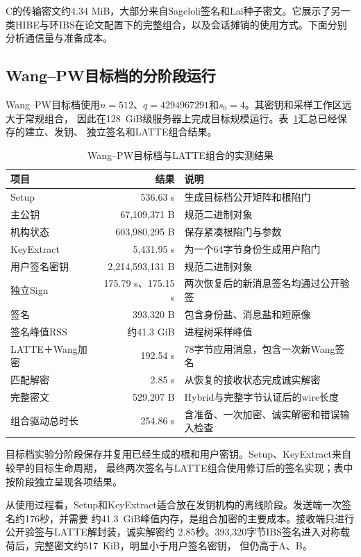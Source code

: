 C的传输密文约4.34 MiB，大部分来自Sageloli签名和Lai种子密文。它展示了另一类HIBE与环IBS在论文配置下的完整组合，以及会话摊销的使用方式。下面分别分析通信量与准备成本。

\subsection{Wang--PW目标档的分阶段运行}

Wang--PW目标档使用$n=512$、$q=4294967291$和$s_0=4$。其密钥和采样工作区远大于常规组合，
因此在128~GiB级服务器上完成目标规模运行。表~\ref{tab:wang-results}汇总已经保存的建立、发钥、
独立签名和LATTE组合结果。

\begin{table}[H]
\centering\small
\caption{Wang--PW目标档与LATTE组合的实测结果}
\label{tab:wang-results}
\begin{tabularx}{\textwidth}{@{}p{}rX@{}}
\toprule
\rowcolor{black!8} 项目 & 结果 & 说明 \\
\midrule
Setup & 536.63 s & 生成目标档公开矩阵和根陷门 \\
主公钥 & 67,109,371 B & 规范二进制对象 \\
机构状态 & 603,980,295 B & 保存紧凑根陷门与参数 \\
KeyExtract & 5,431.95 s & 为一个64字节身份生成用户陷门 \\
用户签名密钥 & 2,214,593,131 B & 规范二进制对象 \\
独立Sign & 175.79 s、175.15 s & 两次恢复后的新消息签名均通过公开验签 \\
签名 & 393,320 B & 包含身份盐、消息盐和短原像 \\
签名峰值RSS & 约41.3 GiB & 进程树采样峰值 \\
LATTE＋Wang加密 & 192.54 s & 78字节应用消息，包含一次新Wang签名 \\
匹配解密 & 2.85 s & 从恢复的接收状态完成诚实解密 \\
完整密文 & 529,207 B & Hybrid与完整字节认证后的wire长度 \\
组合驱动总时长 & 254.86 s & 含准备、一次加密、诚实解密和错误输入检查 \\
\bottomrule
\end{tabularx}
\end{table}

目标档实验分阶段保存并复用已经生成的根和用户密钥。Setup、KeyExtract来自较早的目标生命周期，
最终两次签名与LATTE组合使用修订后的签名实现；表中按阶段独立呈现各项结果。

从使用过程看，Setup和KeyExtract适合放在发钥机构的离线阶段。发送端一次签名约176秒，并需要
约41.3~GiB峰值内存，是组合加密的主要成本。接收端只进行公开验签与LATTE解封装，诚实解密约
2.85秒。393,320字节IBS签名进入对称载荷后，完整密文约517~KiB，明显小于用户签名密钥，
但仍高于A、B。

